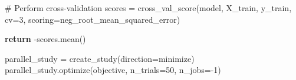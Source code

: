 \documentclass[
  letterpaper,
  DIV=11,
  numbers=noendperiod]{scrreprt}
\newenvironment{Shaded}{\begin{snugshade}}{\end{snugshade}}
\newcommand{\CommentTok}[1]{\textcolor[rgb]{0.37,0.37,0.37}{#1}}
\newcommand{\ControlFlowTok}[1]{\textcolor[rgb]{0.00,0.23,0.31}{\textbf{#1}}}
\newcommand{\DecValTok}[1]{\textcolor[rgb]{0.68,0.00,0.00}{#1}}
\newcommand{\NormalTok}[1]{\textcolor[rgb]{0.00,0.23,0.31}{#1}}
\newcommand{\OperatorTok}[1]{\textcolor[rgb]{0.37,0.37,0.37}{#1}}
\newcommand{\StringTok}[1]{\textcolor[rgb]{0.13,0.47,0.30}{#1}}
\begin{document}
\begin{Shaded}
\begin{Highlighting}[]
    \CommentTok{\# Perform cross{-}validation}
\NormalTok{    scores }\OperatorTok{=}\NormalTok{ cross\_val\_score(model, X\_train, y\_train, cv}\OperatorTok{=}\DecValTok{3}\NormalTok{, scoring}\OperatorTok{=}\StringTok{\textquotesingle{}neg\_root\_mean\_squared\_error\textquotesingle{}}\NormalTok{)}
    
    \ControlFlowTok{return} \OperatorTok{{-}}\NormalTok{scores.mean()}

\NormalTok{parallel\_study }\OperatorTok{=}\NormalTok{ create\_study(direction}\OperatorTok{=}\StringTok{\textquotesingle{}minimize\textquotesingle{}}\NormalTok{)}
\NormalTok{parallel\_study.optimize(objective, n\_trials}\OperatorTok{=}\DecValTok{50}\NormalTok{, n\_jobs}\OperatorTok{={-}}\DecValTok{1}\NormalTok{)}
\end{Highlighting}
\end{Shaded}
\end{document}
